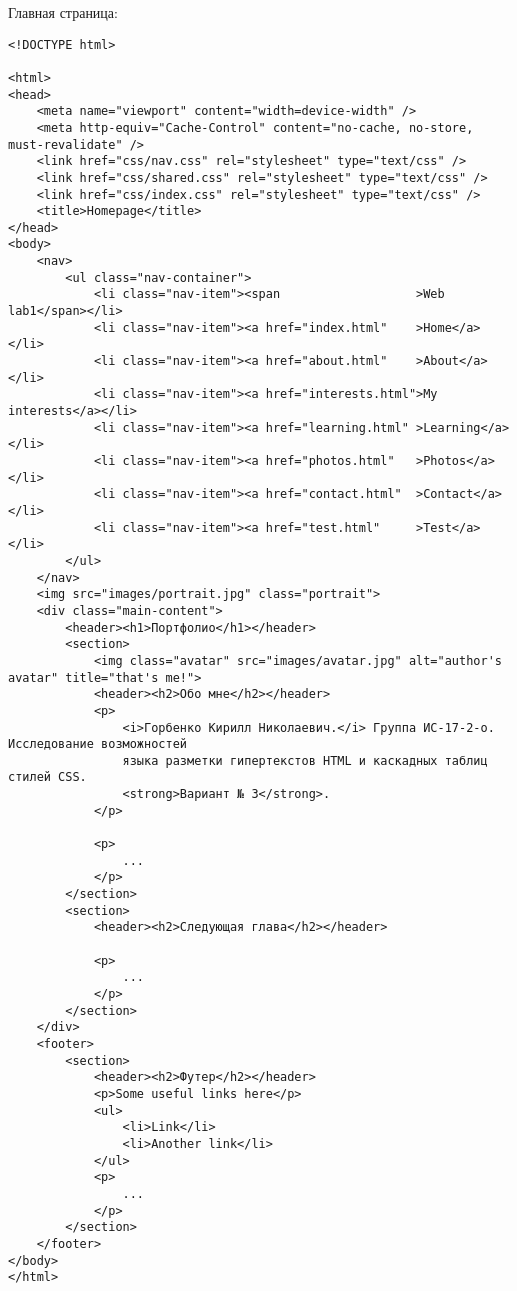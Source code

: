 Главная страница:
\begin{lstlisting}
<!DOCTYPE html>

<html>
<head>
    <meta name="viewport" content="width=device-width" />
    <meta http-equiv="Cache-Control" content="no-cache, no-store, must-revalidate" />
    <link href="css/nav.css" rel="stylesheet" type="text/css" />
    <link href="css/shared.css" rel="stylesheet" type="text/css" />
    <link href="css/index.css" rel="stylesheet" type="text/css" />
    <title>Homepage</title>
</head>
<body>
    <nav>
        <ul class="nav-container">
            <li class="nav-item"><span                   >Web lab1</span></li>
            <li class="nav-item"><a href="index.html"    >Home</a></li>
            <li class="nav-item"><a href="about.html"    >About</a></li>
            <li class="nav-item"><a href="interests.html">My interests</a></li>
            <li class="nav-item"><a href="learning.html" >Learning</a></li>
            <li class="nav-item"><a href="photos.html"   >Photos</a></li>
            <li class="nav-item"><a href="contact.html"  >Contact</a></li>
            <li class="nav-item"><a href="test.html"     >Test</a></li>
        </ul>
    </nav>
    <img src="images/portrait.jpg" class="portrait">
    <div class="main-content">
        <header><h1>Портфолио</h1></header>
        <section>
            <img class="avatar" src="images/avatar.jpg" alt="author's avatar" title="that's me!">
            <header><h2>Обо мне</h2></header>
            <p>
                <i>Горбенко Кирилл Николаевич.</i> Группа ИС-17-2-о. Исследование возможностей
                языка разметки гипертекстов HTML и каскадных таблиц стилей CSS. 
                <strong>Вариант № 3</strong>.
            </p>

            <p>
                ...
            </p>
        </section>
        <section>
            <header><h2>Следующая глава</h2></header>

            <p>
                ...
            </p>
        </section>
    </div>
    <footer>
        <section>
            <header><h2>Футер</h2></header>
            <p>Some useful links here</p>
            <ul>
                <li>Link</li>
                <li>Another link</li>
            </ul>
            <p>
                ...
            </p>
        </section>
    </footer>
</body>
</html>
\end{lstlisting}


